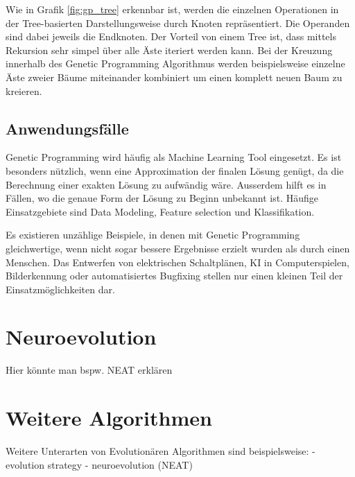 Wie in Grafik \ref{fig:gp_tree} erkennbar ist, werden die einzelnen Operationen in der Tree-basierten
Darstellungsweise durch Knoten repräsentiert. Die Operanden sind dabei jeweils die Endknoten.
Der Vorteil von einem Tree ist, dass mittels Rekursion sehr simpel über alle Äste iteriert werden
kann. Bei der Kreuzung innerhalb des Genetic Programming Algorithmus werden beispielsweise einzelne
Äste zweier Bäume miteinander kombiniert um einen komplett neuen Baum zu kreieren. \cite{GenTree}

\subsection{Anwendungsfälle}
Genetic Programming wird häufig als Machine Learning Tool eingesetzt. Es ist besonders nützlich, wenn
eine Approximation der finalen Lösung genügt, da die Berechnung einer exakten Lösung zu aufwändig
wäre. Ausserdem hilft es in Fällen, wo die genaue Form der Lösung zu Beginn unbekannt ist. Häufige
Einsatzgebiete sind Data Modeling, Feature selection und Klassifikation.

Es existieren unzählige Beispiele, in denen mit Genetic Programming gleichwertige, wenn nicht sogar
bessere Ergebnisse erzielt wurden als durch einen Menschen. Das Entwerfen von elektrischen
Schaltplänen, KI in Computerspielen, Bilderkennung oder automatisiertes Bugfixing stellen nur einen
kleinen Teil der Einsatzmöglichkeiten dar. \cite{Koz10}


\section{Neuroevolution}
Hier könnte man bspw. NEAT erklären

\section{Weitere Algorithmen}

Weitere Unterarten von Evolutionären Algorithmen sind beispielsweise:
- evolution strategy
- neuroevolution (NEAT)



